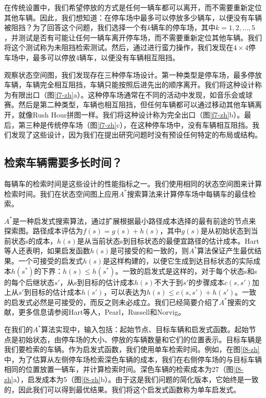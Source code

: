 在传统设置中，我们希望停放的方式是任何一辆车都可以离开，而不需要重新定位其他车辆。因此，我们想知道：在停车场中最多可以停放多少辆车，以便没有车辆被阻挡？为了回答这个问题，我们选择一个有$k$辆车的停车场，其中$k = 1,2,\dots,5$，并测试是否有可能让任何一辆车离开停车场，而不需要重新定位其他车辆。我们将这个测试称为未阻挡检索测试。然后，通过进行蛮力操作，我们发现在$4 \times 4$停车场中，最多可以停放4辆车，以便没有车辆相互阻挡。


观察状态空间图，我们发现存在三种停车场设计。第一种类型是停车场，最多停放车辆，车辆完全相互阻挡，车辆只能按照后进先出的顺序离开。我们将这种设计称为有限出口（图\ref{f7-zh}a）。这种停车场通常在不同的活动中发现，如音乐会或球赛。然后是第二种类型，车辆也相互阻挡，但任何车辆都可以通过移动其他车辆离开，就像Rush Hour拼图一样。我们将这种设计称为完全出口（图\ref{f7-zh}b）。最后，第三种是传统停车场（图\ref{f7-zh}c），在这种停车场中，没有车辆相互阻挡。我们发现了这些设计，因为我们在提出研究问题时没有预设任何特定的布局或结构。

\subsection{检索车辆需要多长时间？}

每辆车的检索时间是这些设计的性能指标之一。我们使用相同的状态空间图来计算检索时间。我们在状态空间图上应用$A^*$搜索算法来计算停车场中每辆车的最佳检索。

$A^*$是一种启发式搜索算法，通过扩展根据最小路径成本选择的最有前途的节点来探索图。路径成本评估为$f(s) = g(s) + h(s)$，其中$g(s)$是从初始状态到当前状态s的成本，$h(s)$是从当前状态s到目标状态的最便宜路径的估计成本。Hart等人还表明，如果启发函数$h(s)$是可接受的和一致的，则$A^*$算法保证产生最优结果。一个可接受的启发式$h(s)$是这样构建的，以便它生成到达目标状态的实际成本$h(s^*)$的下界：$h(s)\le h(s^*)$。一致的启发式是这样的，对于每个状态s和s的每个后继状态$s'$，从s到目标的估计成本$h(s)$不大于到$s'$的步骤成本$c(s, s')$加上从$s'$到目标的估计成本$h(s')$，可以表达为$h(s)\le c(s, s') + h(s')$。一致的启发式必然是可接受的，而反之则未必成立。我们已经简要介绍了$A^*$搜索的文献，更多信息请参阅Hart等人，Pearl，Russell和Norvig。

在我们的$A^*$算法实现中，输入包括：起始节点、目标车辆和启发式函数。起始节点是初始状态，由停车场的大小、停放的车辆数量和它们的位置表示。目标车辆是我们要检索的车辆。作为启发式函数，我们使用单车检索时间。例如，在图\ref{f8-zh}中，为了估算从左侧停车场检索深色车辆的成本，我们在右侧停车场的与目标车辆相同的位置放置一辆车，并计算检索时间。深色车辆的检索成本为27（图\ref{f8-zh}a），启发成本为5（图\ref{f8-zh}b）。由于这是我们问题的简化版本，它始终是一致的，因此我们可以得到最优结果。我们将这个启发式函数称为单车启发式。

